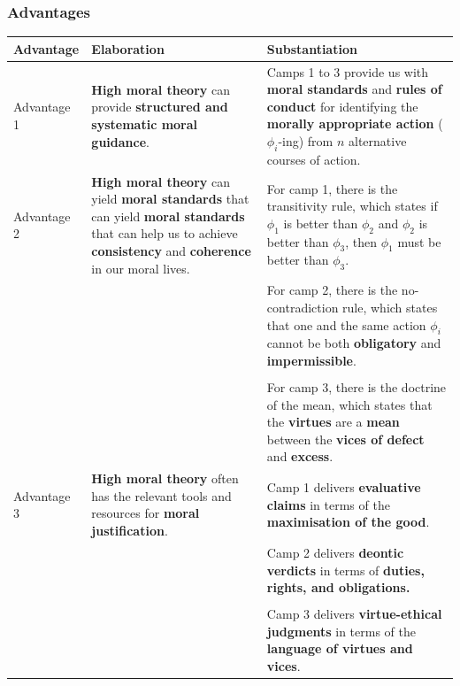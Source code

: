 \documentclass[11pt]{article}
\begin{document}
\subsubsection{Advantages}
\label{sec:org4030b9e}
\begin{center}
\begin{tabular}{|m{5em}|m{10em}|m{20em}|}
\hline
Advantage & Elaboration & Substantiation\\
\hline
Advantage 1 & \textbf{High moral theory} can provide \textbf{structured and systematic moral guidance}. & Camps 1 to 3 provide us with \textbf{moral standards} and \textbf{rules of conduct} for identifying the \textbf{morally appropriate action} (\(\phi_i\)-ing) from \(n\) alternative courses of action.\\
\hline
Advantage 2 & \textbf{High moral theory} can yield \textbf{moral standards} that can yield \textbf{moral standards} that can help us to achieve \textbf{consistency} and \textbf{coherence} in our moral lives. & For camp 1, there is the transitivity rule, which states if \(\phi_1\) is better than \(\phi_2\) and \(\phi_2\) is better than \(\phi_3\), then \(\phi_1\) must be better than \(\phi_3\).\\
 &  & For camp 2, there is the no-contradiction rule, which states that one and the same action \(\phi_i\) cannot be both \textbf{obligatory} and \textbf{impermissible}.\\
 &  & \\
 &  & For camp 3, there is the doctrine of the mean, which states that the \textbf{virtues} are a \textbf{mean} between the \textbf{vices of defect} and \textbf{excess}.\\
\hline
Advantage 3 & \textbf{High moral theory} often has the relevant tools and resources for \textbf{moral justification}. & Camp 1 delivers \textbf{evaluative claims} in terms of the \textbf{maximisation of the good}.\\
 &  & Camp 2 delivers \textbf{deontic verdicts} in terms of \textbf{duties, rights, and obligations.}\\
 &  & \\
 &  & Camp 3 delivers \textbf{virtue-ethical judgments} in terms of the \textbf{language of virtues and vices}.\\
\hline
\end{tabular}
\end{center}
 \newpage
\end{document}
